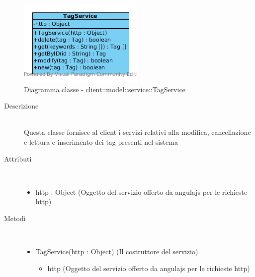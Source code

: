 \vspace{0.5cm}
\hypertarget{client::model::service::TagService}{}
\begin{center}
			\begin{figure}[H]
				\centering \includegraphics[scale=4, max width=\textwidth, max height=\myheight]{../img/diagrammiClassi/client/model/service/TagService.png}
				\caption{Diagramma classe - client::model::service::TagService}
			\end{figure}
		\end{center}\begin{description}
\item[Descrizione] \hfill \\
 Questa classe fornisce al client i servizi relativi alla modifica, cancellazione e lettura e inserimento dei tag presenti nel sistema
\item[Attributi] \hfill \\
 \vspace{-7mm}
\begin{itemize}
\item http : Object (Oggetto del servizio offerto da angulajs per le richieste http)
\end{itemize}

\item[Metodi] \hfill \\
 \vspace{-7mm}
\begin{itemize}
\item TagService(http : Object) (Il costruttore del servizio)\begin{itemize}
\item http (Oggetto del servizio offerto da angulajs per le richieste http)
\end{itemize}


\end{itemize}
\end{description}
